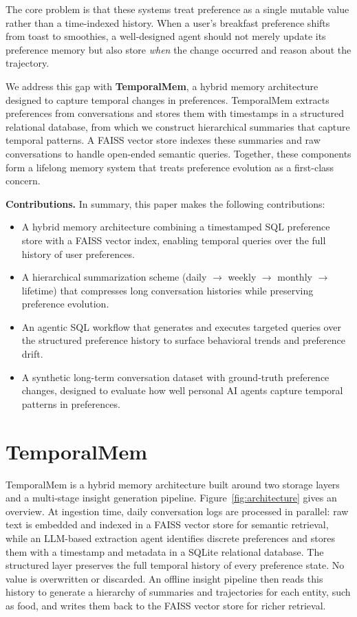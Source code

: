 \documentclass{article}
\begin{document}
The core problem is that these systems treat preference as a single mutable value rather than a time-indexed history. When a user's breakfast preference shifts from toast to smoothies, a well-designed agent should not merely update its preference memory but also store \textit{when} the change occurred and reason about the trajectory.

We address this gap with \textbf{TemporalMem}, a hybrid memory architecture designed to capture temporal changes in preferences. TemporalMem extracts preferences from conversations and stores them with timestamps in a structured relational database, from which we construct hierarchical summaries that capture temporal patterns. A FAISS vector store indexes these summaries and raw conversations to handle open-ended semantic queries. Together, these components form a lifelong memory system that treats preference evolution as a first-class concern.

\noindent\textbf{Contributions.} In summary, this paper makes the following contributions:
\begin{itemize}
    \item A hybrid memory architecture combining a timestamped SQL preference store with a FAISS vector index, enabling temporal queries over the full history of user preferences.
    \item A hierarchical summarization scheme (daily $\rightarrow$ weekly $\rightarrow$ monthly $\rightarrow$ lifetime) that compresses long conversation histories while preserving preference evolution.
    \item An agentic SQL workflow that generates and executes targeted queries over the structured preference history to surface behavioral trends and preference drift.
    \item A synthetic long-term conversation dataset with ground-truth preference changes, designed to evaluate how well personal AI agents capture temporal patterns in preferences.
\end{itemize}


\section{TemporalMem}

TemporalMem is a hybrid memory architecture built around two storage layers and a multi-stage insight generation pipeline. Figure~\ref{fig:architecture} gives an overview. At ingestion time, daily conversation logs are processed in parallel: raw text is embedded and indexed in a FAISS vector store for semantic retrieval, while an LLM-based extraction agent identifies discrete preferences and stores them with a timestamp and metadata in a SQLite relational database. The structured layer preserves the full temporal history of every preference state. No value is overwritten or discarded. An offline insight pipeline then reads this history to generate a hierarchy of summaries and trajectories for each entity, such as food, and writes them back to the FAISS vector store for richer retrieval.
\end{document}
